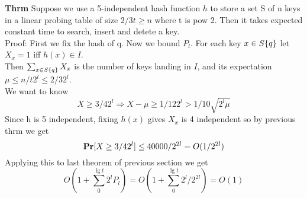 \documentclass[a4paper]{article}
\def\Pr{\mbox{\textbf{Pr}}}
\begin{document}
\textbf{Thrm} Suppose we use a 5-independent hash function \(h\) to store a set S of n keys in a linear probing table of size \(2/3t \geq n\) where t is pow 2. Then it takes expected constant time to search, insert and detete a key.\\
Proof: First we fix the hash of q. Now we bound \(P_l\). For each key \(x \in S\\\{q\}\) let \(X_x = 1\) iff \(h(x)\in I\). \\
Then \(\sum_{x \in S\\\{q\}} X_x\) is the number of keys landing in \(I\), and its expectation \(\mu \leq n/t 2^l \leq 2/3 2^l\).\\
We want to know 
\[X \geq 3/4 2^l \Rightarrow X-\mu \geq 1/12 2^l > 1/10\sqrt{2^l \mu}\]
Since h is 5 independent, fixing \(h(x)\) gives \(X_x\) is 4 independent so by previous thrm we get
\[\Pr[X \geq 3/4 2^l] \leq 40000/2^{2l} = O(1/2^{2l})\]
Applying this to last theorem of previous section we get
\[O(1+\sum_0^{\lg t} 2^lP_l) = O(1+\sum_0^{\lg t} 2^l/2^{2l}) = O(1)\]
\end{document}

